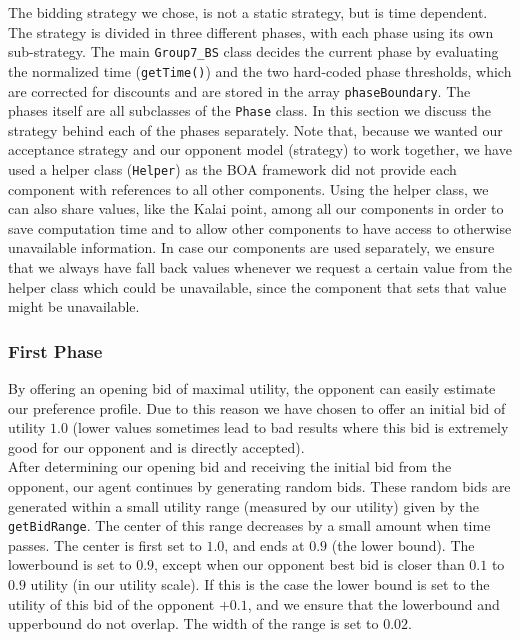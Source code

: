 The bidding strategy we chose, is not a static strategy, but is time dependent. The strategy is divided in three different phases, with each phase using its own sub-strategy. The main \texttt{Group7\_BS} class decides the current phase by evaluating the normalized time (\texttt{getTime()}) and the two hard-coded phase thresholds, which are corrected for discounts and are stored in the array \texttt{phaseBoundary}. 
The phases itself are all subclasses of the \verb-Phase- class. In this section we discuss the strategy behind each of the phases separately. Note that, because we wanted our acceptance strategy and our opponent model (strategy) to 
work together, we have used a helper class (\verb-Helper-) as the BOA framework did not provide each component with references to all other components. Using the helper class, we can also share values, like the Kalai point, among all our components in order to save computation time and to allow other components to have access to otherwise unavailable information. In case our components are used separately, we ensure that we always have fall back values whenever we request a certain value from the helper class which could be unavailable, since the component that sets that value might be unavailable.

\subsubsection{First Phase}
By offering an opening bid of maximal utility, the opponent can easily estimate our preference profile. Due to this reason we have chosen to offer an initial bid of utility $1.0$ (lower values sometimes lead to bad results where this bid is extremely good for our opponent and is directly accepted).\\ 

After determining our opening bid and receiving the initial bid from the opponent, our agent continues by generating random bids. These random bids are generated within a small utility range (measured by our utility) given by the \verb-getBidRange-. The center of this range decreases by a small amount when time passes.
The center is first set to $1.0$, and ends at $0.9$ (the lower bound). The lowerbound is set to $0.9$, except when our opponent best bid is closer than $0.1$ to $0.9$ utility (in our utility scale). If this is the case the lower bound is set to the utility of this bid of the opponent $+0.1$, and we ensure that the lowerbound and upperbound do not overlap. The width of the range is set to  $0.02$. 

